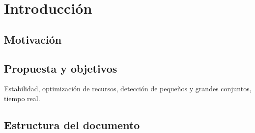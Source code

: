 \chapter{Introducción}\label{chap:introduccion}

\section{Motivación}


\section{Propuesta y objetivos}

Estabilidad, optimización de recursos, detección de pequeños y grandes conjuntos, tiempo real.

\section{Estructura del documento}

